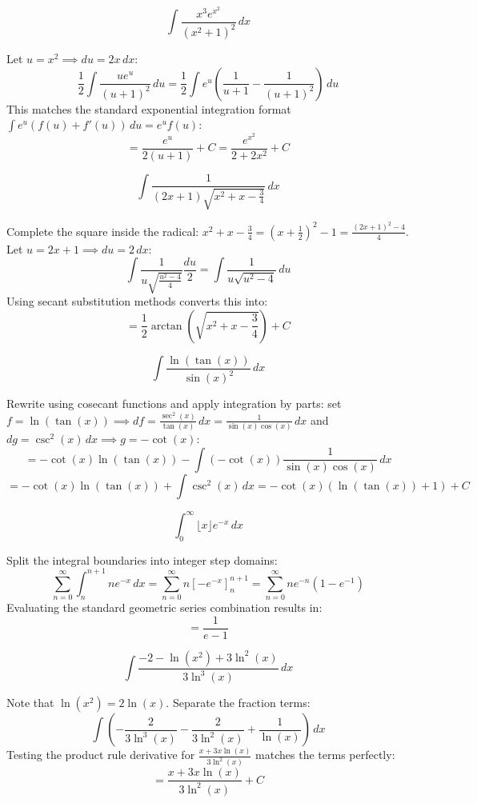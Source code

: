 \begin{questions}

\question
\[ \int \frac{x^{3}e^{x^{2}}}{(x^{2}+1)^{2}} \, dx \]
\begin{solution}
Let $u = x^2 \implies du = 2x \, dx$:
\[ \frac{1}{2}\int \frac{ue^u}{(u+1)^2} \, du = \frac{1}{2}\int e^u \left( \frac{1}{u+1} - \frac{1}{(u+1)^2} \right) \, du \]
This matches the standard exponential integration format $\int e^u (f(u)+f'(u)) \, du = e^u f(u)$:
\[ = \frac{e^u}{2(u+1)} + C = \frac{e^{x^2}}{2+2x^2} + C \]
\end{solution}

\question
\[ \int \frac{1}{(2x+1)\sqrt{x^{2}+x-\frac{3}{4}}} \, dx \]
\begin{solution}
Complete the square inside the radical: $x^2+x-\frac{3}{4} = (x+\frac{1}{2})^2 - 1 = \frac{(2x+1)^2-4}{4}$.
Let $u = 2x+1 \implies du = 2 \, dx$:
\[ \int \frac{1}{u \sqrt{\frac{u^2-4}{4}}} \frac{du}{2} = \int \frac{1}{u\sqrt{u^2-4}} \, du \]
Using secant substitution methods converts this into:
\[ = \frac{1}{2}\arctan\left(\sqrt{x^2+x-\frac{3}{4}}\right) + C \]
\end{solution}

\question
\[ \int \frac{\ln(\tan(x))}{\sin(x)^{2}} \, dx \]
\begin{solution}
Rewrite using cosecant functions and apply integration by parts: set $f = \ln(\tan(x)) \implies df = \frac{\sec^2(x)}{\tan(x)} \, dx = \frac{1}{\sin(x)\cos(x)} \, dx$ and $dg = \csc^2(x) \, dx \implies g = -\cot(x)$:
\[ = -\cot(x)\ln(\tan(x)) - \int (-\cot(x)) \frac{1}{\sin(x)\cos(x)} \, dx \]
\[ = -\cot(x)\ln(\tan(x)) + \int \csc^2(x) \, dx = -\cot(x)(\ln(\tan(x))+1) + C \]
\end{solution}

\question
\[ \int_{0}^{\infty} \lfloor x\rfloor e^{-x} \, dx \]
\begin{solution}
Split the integral boundaries into integer step domains:
\[ \sum_{n=0}^{\infty} \int_{n}^{n+1} n e^{-x} \, dx = \sum_{n=0}^{\infty} n \left[-e^{-x}\right]_{n}^{n+1} = \sum_{n=0}^{\infty} n e^{-n}(1-e^{-1}) \]
Evaluating the standard geometric series combination results in:
\[ = \frac{1}{e-1} \]
\end{solution}

\question
\[ \int \frac{-2-\ln(x^{2})+3\ln^{2}(x)}{3\ln^{3}(x)} \, dx \]
\begin{solution}
Note that $\ln(x^2) = 2\ln(x)$. Separate the fraction terms:
\[ \int \left( -\frac{2}{3\ln^3(x)} - \frac{2}{3\ln^2(x)} + \frac{1}{\ln(x)} \right) \, dx \]
Testing the product rule derivative for $\frac{x+3x\ln(x)}{3\ln^2(x)}$ matches the terms perfectly:
\[ = \frac{x+3x\ln(x)}{3\ln^2(x)} + C \]
\end{solution}


\end{questions}
